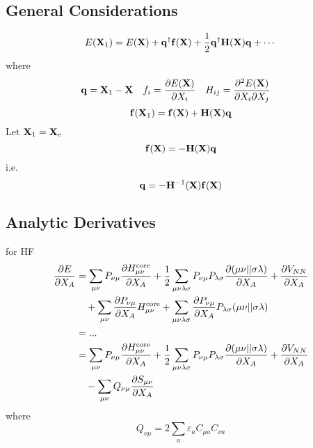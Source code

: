\documentclass[a4paper]{article}
\DeclareMathOperator{\core}{\mathrm{core}}
\numberwithin{equation}{section}
\begin{document}
\subsection{General Considerations}
\begin{equation}\label{key}
E(\vb{X}_1) = E(\vb{X}) + \vb{q}^\dagger \vb{f}(\vb{X}) + \dfrac{1}{2}\vb{q}^\dagger \vb{H}(\vb{X}) \vb{q} + \cdots
\end{equation}
where
\begin{align}
& \vb{q} = \vb{X}_1 - \vb{X} && f_i = \pdv{E(\vb{X})}{X_i} && H_{ij} = \pdv{E(\vb{X})}{X_i}{X_j} &
\end{align}
\begin{equation}\label{key}
\vb{f}(\vb{X}_1) = \vb{f}(\vb{X}) + \vb{H}(\vb{X})\vb{q}
\end{equation}
Let $ \vb{X}_1 = \vb{X}_e $
\begin{equation}\label{key}
\vb{f}(\vb{X}) = - \vb{H}(\vb{X})\vb{q}
\end{equation}
i.e.
\begin{equation}\label{key}
\vb{q} = - \vb{H}^{-1}(\vb{X})\vb{f}(\vb{X})
\end{equation}

\subsection{Analytic Derivatives}
for HF
\begin{align}
\pdv{E}{X_A} &= \sum_{\mu\nu} P_{\nu\mu} \pdv{H_{\mu\nu}^{\core}}{X_A} 
+ \dfrac{1}{2}\sum_{\mu\nu\lambda\sigma} P_{\nu\mu}P_{\lambda\sigma} \pdv{(\mu\nu||\sigma\lambda)}{X_A} 
+ \pdv{V_{NN}}{X_A} \notag\\
&\quad {}
+ \sum_{\mu\nu} \pdv{P_{\nu\mu}}{X_A} H_{\mu\nu}^{\core}
+ \sum_{\mu\nu\lambda\sigma} \pdv{P_{\nu\mu}}{X_A}P_{\lambda\sigma} (\mu\nu||\sigma\lambda) \notag\\
&= ... \notag\\
&= \sum_{\mu\nu} P_{\nu\mu} \pdv{H_{\mu\nu}^{\core}}{X_A} 
+ \dfrac{1}{2}\sum_{\mu\nu\lambda\sigma} P_{\nu\mu}P_{\lambda\sigma} \pdv{(\mu\nu||\sigma\lambda)}{X_A} 
+ \pdv{V_{NN}}{X_A} \notag\\
&\quad {} - \sum_{\mu\nu} Q_{\nu\mu} \pdv{S_{\mu\nu}}{X_A}
\end{align}
where
\begin{equation}\label{key}
Q_{\nu\mu} = 2\sum_a \varepsilon_a C_{\mu a} C_{\nu a}
\end{equation}
\end{document}
